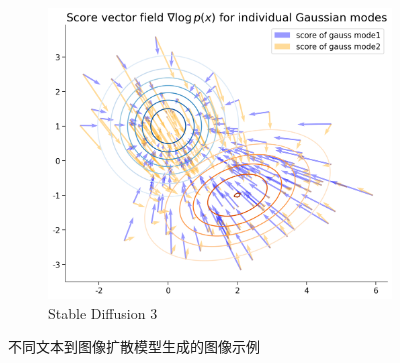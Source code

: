 \begin{itemize}
\begin{figure}[H]
        \vspace{1cm}

        \begin{subfigure}[b]{0.6\textwidth}
            \centering
            \includegraphics[width=\textwidth]{figures/D9.png}
            \caption{Stable Diffusion 3}
            \label{fig:sd3_example}
        \end{subfigure}
        \caption{不同文本到图像扩散模型生成的图像示例}
        \label{fig:diffusion_model_examples}
    \end{figure}

\end{itemize}

